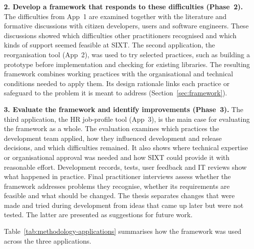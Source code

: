 \documentclass[10pt,a4paper]{article}
\begin{document}
\textbf{2. Develop a framework that responds to these difficulties
(Phase~2).} The difficulties from App~1 are examined together with the
literature and formative discussions with citizen developers, users and
software engineers. These discussions showed which difficulties other
practitioners recognised and which kinds of support seemed feasible at
SIXT. The second application, the reorganisation tool (App~2), was used
to try selected practices, such as building a prototype before
implementation and checking for existing libraries. The resulting
framework combines working practices with the organisational and
technical conditions needed to apply them. Its design rationale links
each practice or safeguard to the problem it is meant to address
(Section~\ref{sec:framework}).
 
\textbf{3. Evaluate the framework and identify improvements
(Phase~3).} The third application, the HR job-profile tool (App~3), is
the main case for evaluating the framework as a whole. The evaluation
examines which practices the development team applied, how they
influenced development and release decisions, and which difficulties
remained. It also shows where technical expertise or organisational
approval was needed and how SIXT could provide it with reasonable
effort. Development records, tests, user feedback and IT reviews show
what happened in practice. Final practitioner interviews assess whether
the framework addresses problems they recognise, whether its
requirements are feasible and what should be changed. The thesis separates changes that were made and tried during
development from ideas that came up later but were not tested. The
latter are presented as suggestions for future work.
 
Table~\ref{tab:methodology-applications} summarises how the framework
was used across the three applications.
 
\end{document}
